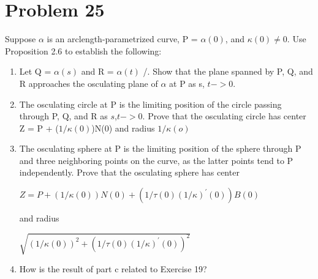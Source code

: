 \documentclass[
	12pt, %
]{fphw}
\theoremstyle{plain}
\begin{document}
\section*{Problem 25}
\begin{problem}
     Suppose $\alpha$ is an arclength-parametrized curve, P = $\alpha(0)$, and $\kappa(0) \neq 0$. Use Proposition 2.6 to
     establish the following:
     \begin{enumerate}
          \item Let Q = $\alpha(s)$ and R = $\alpha(t)$ /. Show that the plane spanned by P, Q, and R approaches the
          osculating plane of $\alpha$ at P as s, $t->0$.
          \item The osculating circle at P is the limiting position of the circle passing through P, Q, and R as
          $s$,$t -> 0$. Prove that the osculating circle has center Z = P + ($1/\kappa(0)$)N(0) and radius $1/\kappa(o)$
          \item The osculating sphere at P is the limiting position of the sphere through P and three neighboring
          points on the curve, as the latter points tend to P independently. Prove that the osculating sphere
          has center\\
          \begin{center}
              $ Z = P + (1/\kappa(0))N(0) + (1/\tau(0)(1/\kappa)^{'}(0))B(0)$
          \end{center}
          and radius
          \begin{center}
               $ \sqrt{(1/\kappa(0))^{2} + (1/\tau(0)(1/\kappa)^{'}(0))^2} $
           \end{center}
          \item How is the result of part c related to Exercise 19?
     \end{enumerate}
\end{problem}
\end{document}
